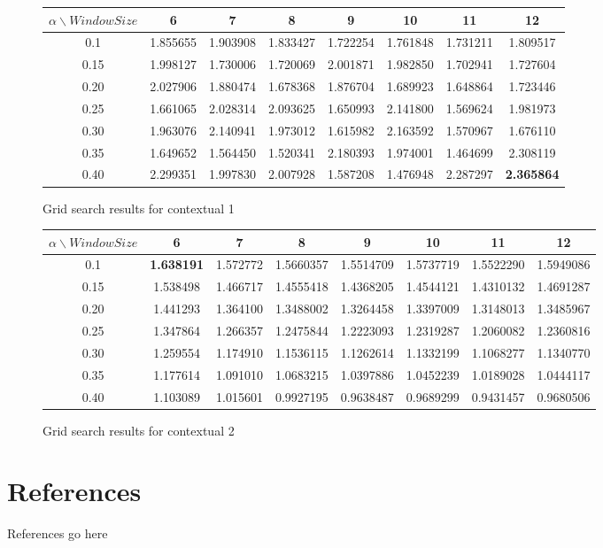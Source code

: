 \documentclass[a4paper,12pt]{article}
\begin{document}
\begin{figure}[htp]
	\centering
		\begin{tabular}{|c|c|c|c|c|c|c|c|}
		\hline
		$\alpha \backslash Window Size$ & 6 & 7 & 8 & 9 & 10 & 11 & 12 \\ \hline
		0.1 & 1.855655 & 1.903908 & 1.833427 & 1.722254 & 1.761848 & 1.731211 & 1.809517 \\ \hline
		0.15 & 1.998127 & 1.730006 & 1.720069 & 2.001871 & 1.982850 & 1.702941 & 1.727604 \\ \hline
		0.20 & 2.027906 & 1.880474 & 1.678368 & 1.876704 & 1.689923 & 1.648864 & 1.723446 \\ \hline
		0.25 & 1.661065 & 2.028314 & 2.093625 & 1.650993 & 2.141800 & 1.569624 & 1.981973 \\ \hline
		0.30 & 1.963076 & 2.140941 & 1.973012 & 1.615982 & 2.163592 & 1.570967 & 1.676110 \\ \hline
		0.35 & 1.649652 & 1.564450 & 1.520341 & 2.180393 & 1.974001 & 1.464699 & 2.308119 \\ \hline
		0.40 & 2.299351 & 1.997830 & 2.007928 & 1.587208 & 1.476948 & 2.287297 & \textbf{2.365864} \\ \hline
		\end{tabular}
	\caption{Grid search results for contextual 1}
	\label{gridsearch1}
\end{figure}

\begin{figure}[htp]
	\centering
		\begin{tabular}{|c|c|c|c|c|c|c|c|}
		\hline
		$\alpha \backslash Window Size$ & 6 & 7 & 8 & 9 & 10 & 11 & 12 \\ \hline
		0.1 & \textbf{1.638191} & 1.572772 & 1.5660357 & 1.5514709 & 1.5737719 & 1.5522290 & 1.5949086 \\ \hline
		0.15 & 1.538498 & 1.466717 & 1.4555418 & 1.4368205 & 1.4544121 & 1.4310132 & 1.4691287 \\ \hline
		0.20 & 1.441293 & 1.364100 & 1.3488002 & 1.3264458 & 1.3397009 & 1.3148013 & 1.3485967 \\ \hline
		0.25 & 1.347864 & 1.266357 & 1.2475844 & 1.2223093 & 1.2319287 & 1.2060082 & 1.2360816 \\ \hline
		0.30 & 1.259554 & 1.174910 & 1.1536115 & 1.1262614 & 1.1332199 & 1.1068277 & 1.1340770 \\ \hline
		0.35 & 1.177614 & 1.091010 & 1.0683215 & 1.0397886 & 1.0452239 & 1.0189028 & 1.0444117 \\ \hline
		0.40 & 1.103089 & 1.015601 & 0.9927195 & 0.9638487 & 0.9689299 & 0.9431457 & 0.9680506 \\ \hline
		\end{tabular}
	\caption{Grid search results for contextual 2}
	\label{gridsearch2}
\end{figure}

\newpage

\section{References}
References go here
\end{document}
